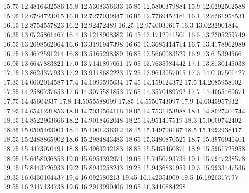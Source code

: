           15.75    12.4816432586
           15.8    12.5308356133
          15.85    12.5800379884
           15.9    12.6292502588
          15.95    12.6784723015
           16.0    12.7277039947
          16.05    12.7769452181
           16.1    12.8261958531
          16.15    12.8754557823
           16.2      12.92472489
          16.25    12.9740030617
           16.3    13.0232901844
          16.35    13.0725861467
           16.4    13.1218908382
          16.45    13.1712041501
           16.5    13.2205259749
          16.55    13.2698562064
           16.6    13.3191947398
          16.65    13.3685414714
           16.7    13.4178962989
          16.75    13.4672591214
           16.8    13.5166298389
          16.85    13.5660083529
           16.9     13.615394566
          16.95    13.6647883821
           17.0    13.7141897061
          17.05    13.7635984442
           17.1    13.8130145038
          17.15    13.8624377933
           17.2    13.9118682223
          17.25    13.9613057015
           17.3    14.0107501427
          17.35    14.0602014587
           17.4    14.1096595634
          17.45     14.159124372
           17.5    14.2085958002
          17.55    14.2580737653
           17.6    14.3075581853
          17.65    14.3570489792
           17.7    14.4065460671
          17.75      14.45604937
           17.8    14.5055588099
          17.85    14.5550743097
           17.9    14.6045957932
          17.95    14.6541231853
           18.0    14.7036564116
          18.05    14.7531953988
           18.1    14.8027400744
          18.15    14.8522903666
           18.2    14.9018462048
          18.25     14.951407519
           18.3    15.0009742402
          18.35    15.0505463001
           18.4    15.1001236312
          18.45     15.149706167
           18.5    15.1992938417
          18.55    15.2488865902
           18.6    15.2984843483
          18.65    15.3480870525
           18.7    15.3976946401
          18.75    15.4473070491
           18.8    15.4969242183
          18.85    15.5465460871
           18.9    15.5961725958
          18.95    15.6458036853
           19.0    15.6954392971
          19.05    15.7450793736
           19.1    15.7947238578
          19.15    15.8443726933
           19.2    15.8940258243
          19.25    15.9436831959
           19.3    15.9933447536
          19.35    16.0430104437
           19.4     16.092680213
          19.45     16.142354009
           19.5    16.1920317797
          19.55    16.2417134738
           19.6    16.2913990406
          19.65    16.3410884298

